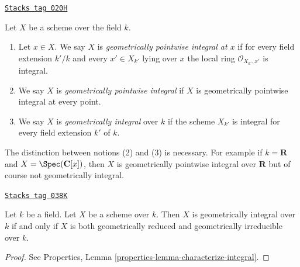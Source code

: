 \begin{definition}
\label{varieties-definition-geometrically-integral}
\href{https://stacks.math.columbia.edu/tag/020H}{\texttt{Stacks tag 020H}}

Let $X$ be a scheme over the field $k$.
\begin{enumerate}
\item Let $x \in X$. We say $X$ is
{\it geometrically pointwise integral at $x$} if for every
field extension $k'/k$ and every $x' \in X_{k'}$ lying over $x$
the local ring $\mathcal{O}_{X_{k'}, x'}$ is integral.
\item We say $X$ is {\it geometrically pointwise integral} if $X$
is geometrically pointwise integral at every point.
\item We say $X$ is {\it geometrically integral} over $k$ if the scheme
$X_{k'}$ is integral for every field extension $k'$ of $k$.
\end{enumerate}
\end{definition}

The distinction between notions (2) and (3) is necessary.
For example if $k = \mathbf{R}$ and $X = \Spec(\mathbf{C}[x])$,
then $X$ is geometrically pointwise integral over $\mathbf{R}$ but
of course not geometrically integral.

\begin{lemma}
\label{varieties-lemma-geometrically-integral}
\href{https://stacks.math.columbia.edu/tag/038K}{\texttt{Stacks tag 038K}}

Let $k$ be a field.
Let $X$ be a scheme over $k$.
Then $X$ is geometrically integral over $k$ if and only if
$X$ is both geometrically reduced and geometrically irreducible
over $k$.
\end{lemma}

\begin{proof}
See Properties, Lemma \ref{properties-lemma-characterize-integral}.
\end{proof}

